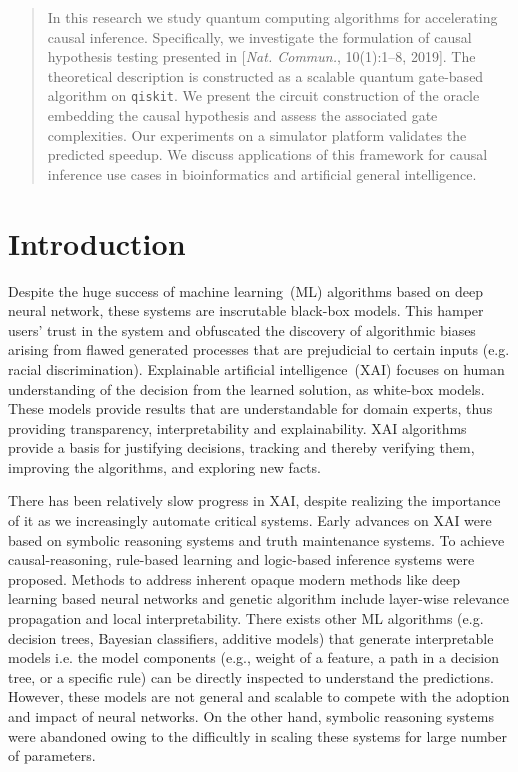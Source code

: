 \begin{abstract}

In this research we study quantum computing algorithms for accelerating causal inference.
Specifically, we investigate the formulation of causal hypothesis testing presented in [\textit{Nat.
Commun.}, 10(1):1–8, 2019].
The theoretical description is constructed as a scalable quantum gate-based algorithm on \texttt{qiskit}.
We present the circuit construction of the oracle embedding the causal hypothesis and assess the associated gate complexities.
Our experiments on a simulator platform validates the predicted speedup.
We discuss applications of this framework for causal inference use cases in bioinformatics and artificial general intelligence.

\end{abstract}

\vspace{-1em}

\section{Introduction} \label{s1}

Despite the huge success of machine learning~(ML) algorithms based on deep neural network, these systems are inscrutable black-box models.
This hamper users' trust in the system and obfuscated the discovery of algorithmic biases arising from flawed generated processes that are prejudicial to certain inputs (e.g. racial discrimination).
Explainable artificial intelligence~(XAI) focuses on human understanding of the decision from the learned solution, as white-box models.
These models provide results that are understandable for domain experts, thus providing transparency, interpretability and explainability.
XAI algorithms provide a basis for justifying decisions, tracking and thereby verifying them, improving the algorithms, and exploring new facts.

There has been relatively slow progress in XAI, despite realizing the importance of it as we increasingly automate critical systems.
Early advances on XAI were based on symbolic reasoning systems and truth maintenance systems.
To achieve causal-reasoning, rule-based learning and logic-based inference systems were proposed.
Methods to address inherent opaque modern methods like deep learning based neural networks and genetic algorithm include layer-wise relevance propagation and local interpretability.
There exists other ML algorithms (e.g. decision trees, Bayesian classifiers, additive models) that generate interpretable models i.e. the model components (e.g., weight of a feature, a path in a decision tree, or a specific rule) can be directly inspected to understand the predictions.
However, these models are not general and scalable to compete with the adoption and impact of neural networks.
On the other hand, symbolic reasoning systems were abandoned owing to the difficultly in scaling these systems for large number of parameters.

